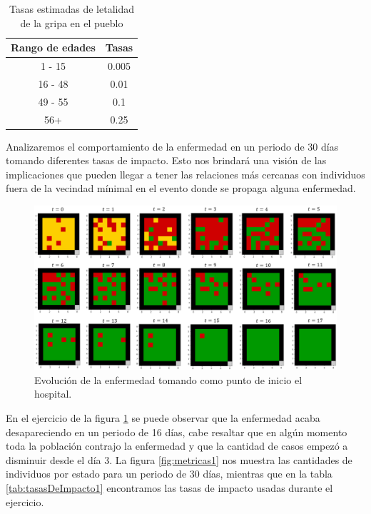 \begin{table}[h]
\begin{center}
\begin{tabular}{| c | c |}
\hline
Rango de edades & Tasas \\ \hline
1 - 15 & 0.005 \\
16 - 48 & 0.01 \\
49 - 55 & 0.1 \\
56+ & 0.25 \\\hline
\end{tabular}
\caption{Tasas estimadas de letalidad de la gripa en el pueblo}
\end{center}
\end{table}

Analizaremos el comportamiento de la enfermedad en un periodo de 30 días tomando diferentes tasas de impacto. Esto nos brindará una visión de las implicaciones que pueden llegar a tener las relaciones más cercanas con individuos fuera de la vecindad mínimal en el evento donde se propaga alguna enfermedad.

\begin{figure}[h]
  \centering
    \includegraphics[width=1\textwidth]{Imagenes/evo1.PNG}
    \caption{Evolución de la enfermedad tomando como punto de inicio el hospital.}
    \label{fig:evo1}
\end{figure}

En el ejercicio de la figura \ref{fig:evo1} se puede observar que la enfermedad acaba desapareciendo en un periodo de 16 días, cabe resaltar que en algún momento toda la población contrajo la enfermedad y que la cantidad de casos empezó a disminuir desde el día 3. La figura \ref{fig:metricas1} nos muestra las cantidades de individuos por estado para un periodo de 30 días, mientras que en la tabla \ref{tab:tasasDeImpacto1} encontramos las tasas de impacto usadas durante el ejercicio.

